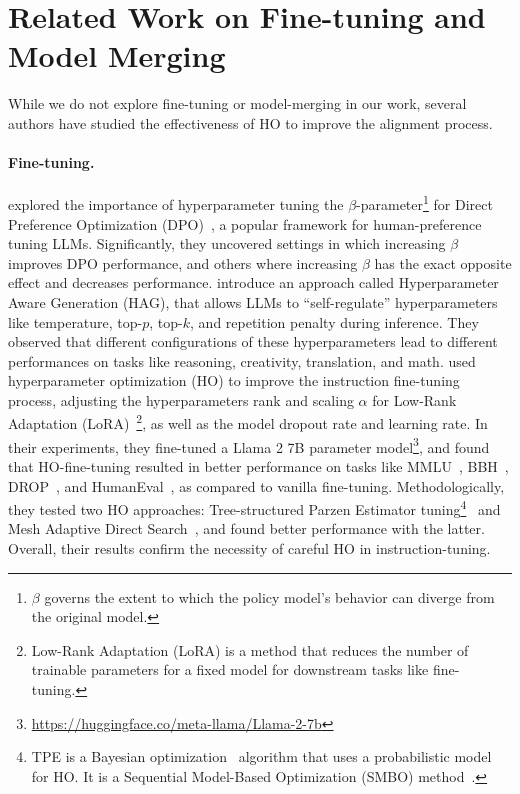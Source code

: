 \section{Related Work on Fine-tuning and Model Merging}
\label{appendix:related}

While we do not explore fine-tuning or model-merging in our work, several authors have studied the effectiveness of HO to improve the alignment process. 

\paragraph{Fine-tuning.}\citet{wu2024beta} explored the importance of hyperparameter tuning the $\beta$-parameter\footnote{$\beta$ governs the extent to which the policy model's behavior can diverge from the original model.} for Direct Preference Optimization (DPO)~\citep{rafailov2024direct}, a popular framework for human-preference tuning LLMs. Significantly, they uncovered settings in which increasing $\beta$ improves DPO performance, and others where increasing $\beta$ has the exact opposite effect and decreases performance. %
\citet{wang2024llm} introduce an approach called Hyperparameter Aware Generation
(HAG), that allows LLMs to ``self-regulate'' hyperparameters like temperature, top-$p$, top-$k$, and repetition penalty during inference. They observed that different configurations of these hyperparameters lead to different performances on tasks like reasoning, creativity, translation, and math. %
\citet{tribes2023hyperparameter} used hyperparameter optimization (HO) to improve the instruction fine-tuning process, adjusting the hyperparameters rank and scaling $\alpha$ for Low-Rank Adaptation (LoRA)~\citep{hu2021lora}\footnote{Low-Rank Adaptation (LoRA) is a method that reduces the number of trainable parameters for a fixed model for downstream tasks like fine-tuning.}, as well as the model dropout rate and learning rate. In their experiments, they fine-tuned a Llama 2 7B parameter model\footnote{\url{https://huggingface.co/meta-llama/Llama-2-7b}}, and found that HO-fine-tuning resulted in better performance on tasks like MMLU~\citep{hendrycks2020measuring}, BBH~\citep{suzgun2022challenging}, DROP~\citep{dua2019drop}, and HumanEval~\citep{chen2021evaluating}, as compared to vanilla fine-tuning. Methodologically, they tested two HO approaches: Tree-structured Parzen Estimator tuning\footnote{TPE is a Bayesian optimization~\citep{bergstra2011algorithms} algorithm that uses a probabilistic model for HO. It is a Sequential Model-Based Optimization (SMBO) method~\citep{hutter2010sequential}.}~\citep{bergstra2011algorithms} and Mesh Adaptive Direct Search~\citep{audet2006mesh}, and found better performance with the latter. Overall, their results confirm the necessity of careful HO in instruction-tuning.

